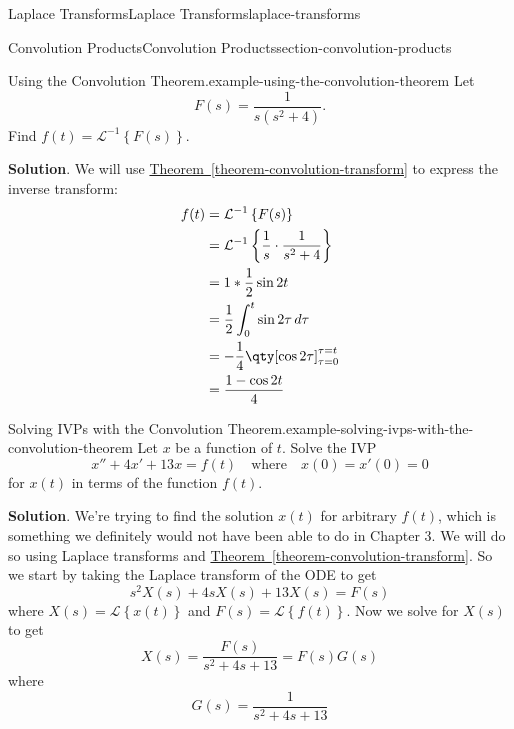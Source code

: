 \documentclass[oneside,10pt,]{book}
\numberwithin{equation}{section}
\newcommand{\Int}[2]{\int_{#1}^{#2}}
\newcommand{\Laplace}[1]{\mathcal{L}\left\{#1\right\}}
\newcommand{\iLaplace}[1]{\mathcal{L}^{-1}\left\{#1\right\}}
\newcommand{\qq}[1]{\quad\text{#1}\quad}
\newcommand{\amp}{&}
\begin{document}
\begin{chapterptx}{Laplace Transforms}{}{Laplace Transforms}{}{}{laplace-transforms}
\begin{sectionptx}{Convolution Products}{}{Convolution Products}{}{}{section-convolution-products}
\begin{example}{Using the Convolution Theorem.}{example-using-the-convolution-theorem}%
\hypertarget{p-562}{}%
Let%
\begin{equation*}
F(s) = \frac{1}{s(s^{2}+4)}.
\end{equation*}
Find \(f(t) = \iLaplace{F(s)}\).%
\par\smallskip%
\noindent\textbf{Solution}.\hypertarget{solution-91}{}\quad%
\hypertarget{p-563}{}%
We will use \hyperref[theorem-convolution-transform]{Theorem~\ref{theorem-convolution-transform}} to express the inverse transform:%
\begin{align*}
f(t) \amp= \iLaplace{F(s)}\\
\amp= \iLaplace{\frac{1}{s}\cdot\frac{1}{s^{2}+4}}\\
\amp= 1\ast \frac{1}{2}\sin2t\\
\amp= \frac{1}{2}\Int{0}{t}\sin2\tau\,d\tau\\
\amp= -\frac{1}{4}\qty[\cos2\tau]_{\tau=0}^{\tau=t}\\
\amp= \frac{1-\cos2t}{4}
\end{align*}
%
\end{example}
\begin{example}{Solving IVPs with the Convolution Theorem.}{example-solving-ivps-with-the-convolution-theorem}%
\hypertarget{p-564}{}%
Let \(x\) be a function of \(t\). Solve the IVP%
\begin{equation*}
x''+4x'+13x = f(t)\qq{where}x(0) = x'(0) = 0
\end{equation*}
for \(x(t)\) in terms of the function \(f(t)\).%
\par\smallskip%
\noindent\textbf{Solution}.\hypertarget{solution-92}{}\quad%
\hypertarget{p-565}{}%
We're trying to find the solution \(x(t)\) for arbitrary \(f(t)\), which is something we definitely would not have been able to do in Chapter 3. We will do so using Laplace transforms and \hyperref[theorem-convolution-transform]{Theorem~\ref{theorem-convolution-transform}}. So we start by taking the Laplace transform of the ODE to get%
\begin{equation*}
s^{2}X(s) +4sX(s) + 13X(s) = F(s)
\end{equation*}
where \(X(s) = \Laplace{x(t)}\) and \(F(s) = \Laplace{f(t)}\). Now we solve for \(X(s)\) to get%
\begin{equation*}
X(s) = \frac{F(s)}{s^{2}+4s+13} = F(s)G(s)
\end{equation*}
where%
\begin{equation*}
G(s) = \frac{1}{s^{2}+4s+13}

\end{equation*}
\end{example}
\end{sectionptx}
\end{chapterptx}
\end{document}
